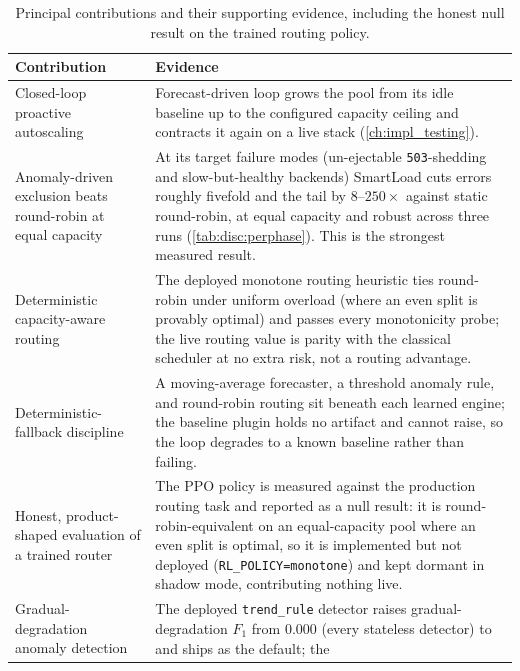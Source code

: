 \begin{table}[H]
  \centering
  \caption[Principal contributions and their supporting evidence]{Principal contributions and their supporting evidence, including the honest null result on the trained routing policy.}
  \label{tab:conc:contributions}
  \small
  \begin{tabularx}{\linewidth}{@{}p{4.0cm} Y@{}}
    \toprule
    \headrow
    \textbf{Contribution} & \textbf{Evidence} \\
    \midrule
    Closed-loop proactive autoscaling
      & Forecast-driven loop grows the pool from its idle baseline up to the configured
        capacity ceiling and contracts it again on a live stack (\cref{ch:impl_testing}).
        \\
    Anomaly-driven exclusion beats round-robin at equal capacity
      & At its target failure modes (un-ejectable \texttt{503}-shedding and slow-but-healthy
        backends) SmartLoad cuts errors roughly fivefold and the tail by $8$--$250\times$
        against static round-robin, at equal capacity and robust across three runs
        (\cref{tab:disc:perphase}). This is the strongest measured result. \\
    Deterministic capacity-aware routing
      & The deployed monotone routing heuristic ties round-robin under uniform overload
        (where an even split is provably optimal) and passes every monotonicity probe; the
        live routing value is parity with the classical scheduler at no extra risk, not a
        routing advantage. \\
    Deterministic-fallback discipline
      & A moving-average forecaster, a threshold anomaly rule, and round-robin routing
        sit beneath each learned engine; the baseline plugin holds no artifact and
        cannot raise, so the loop degrades to a known baseline rather than failing. \\
    Honest, product-shaped evaluation of a trained router
      & The PPO policy \cite{schulman2017ppo,raffin2021sb3} is measured against the
        production routing task and reported as a null result: it is
        round-robin-equivalent on an equal-capacity pool where an even split is optimal,
        so it is implemented but not deployed (\texttt{RL\_POLICY=monotone}) and kept
        dormant in shadow mode, contributing nothing live. \\
    Gradual-degradation anomaly detection
      & The deployed \texttt{trend\_rule} detector raises gradual-degradation $F_1$ from
        $0.000$ (every stateless detector) to \BManFone{} and ships as the default; the

\end{tabularx}
\end{table}
